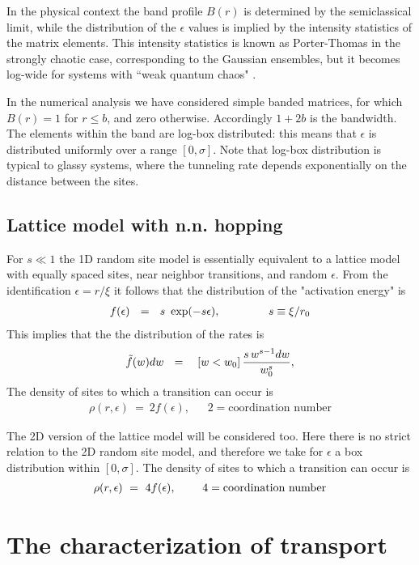 \documentclass[onecolumn,fleqn,12pt,openany,draft]{book}
\newcommand{\mylabel}[1]{\label{#1}}
\newcommand{\beq}{\begin{eqnarray}}
\newcommand{\eeq}{\end{eqnarray}}
\newcommand{\be}[1]{\begin{eqnarray}\ifthenelse{#1=-1}
{\nonumber}{\ifthenelse{#1=0}{}{\mylabel{e#1}}}}
\begin{document}
In the physical context the band profile $B(r)$ is determined 
by the semiclassical limit, while the distribution of the $\epsilon$ 
values is implied by the intensity statistics of the matrix elements.
This intensity statistics is known as Porter-Thomas in the strongly 
chaotic case, corresponding to the Gaussian ensembles, 
but it becomes log-wide for systems with ``weak quantum chaos" \cite{SparseMat,kbw}. 

In the numerical analysis we have considered simple 
banded matrices, for which $B(r)=1$ for ${r \leq b}$, 
and zero otherwise. Accordingly $1{+}2b$ is the bandwidth.
The elements within the band are log-box distributed:
this means that $\epsilon$ is distributed uniformly over a range $[0,\sigma]$.  
Note that log-box distribution is typical to glassy systems, 
where the tunneling rate depends exponentially on the distance  
between the sites.


\subsection{Lattice model with n.n. hopping}

For $s \ll 1$ the 1D random site model is 
essentially equivalent to a lattice model 
with equally spaced sites, 
near neighbor transitions, 
and random $\epsilon$.
From the identification $\epsilon=r/\xi$ 
it follows that the distribution 
of the "activation energy" is 
%
\beq
f(\epsilon) \ \ = \ \ s \ \exp(-s\epsilon), 
\hspace{15mm} s \equiv \xi/r_0
\eeq
%
This implies that the the distribution of the rates is 
%
\be{15}
\tilde{f}(w) dw  \ \  =  \ \    \ [w < w_0] \, \frac{s \, w^{s-1} dw}{w_0^s}, 
\eeq
%
The density of sites to which a transition can occur is
%
\beq
\rho(r,\epsilon) \ = \ 2f(\epsilon), 
\ \ \ \ \ \ \ 2=\text{coordination number} 
\eeq 

 
The 2D version of the lattice model 
will be considered too. Here there is no 
strict relation to the 2D random site model, 
and therefore we take for $\epsilon$ a box 
distribution within ${[0,\sigma]}$.
The density of sites to which a transition can occur is
%
\be{17}
\rho(r,\epsilon) \ = \ 4f(\epsilon), 
\ \ \ \ \ \ \ 4=\text{coordination number} 
\eeq 




\section{The characterization of transport}
\end{document}
